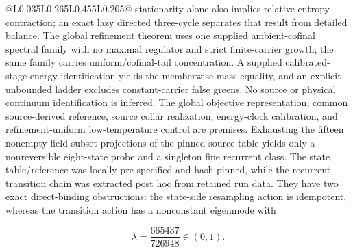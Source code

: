 \documentclass[10pt]{article}
\begin{document}
\begin{center}
\begin{longtable}{@{}L{0.035\linewidth}L{0.265\linewidth}L{0.455\linewidth}L{0.205\linewidth}@{}}
stationarity alone also implies relative-entropy contraction; an exact lazy
directed three-cycle separates that result from detailed balance. The global
refinement theorem uses one supplied ambient-cofinal spectral family with
no maximal regulator and strict finite-carrier growth; the same family carries
uniform/cofinal-tail concentration. A supplied calibrated-stage energy
identification yields the memberwise mass equality, and an explicit
unbounded ladder excludes constant-carrier false greens.  No source or
physical continuum identification is inferred. The global
objective representation, common source-derived reference, source collar
realization, energy-clock calibration, and refinement-uniform low-temperature
control are premises. Exhausting the fifteen
nonempty field-subset projections of the pinned source table yields only a
nonreversible eight-state probe and a singleton fine recurrent class. The
state table/reference was locally pre-specified and hash-pinned, while the
recurrent transition chain was extracted post hoc from retained run data.
They have
two exact direct-binding obstructions: the state-side resampling action is
idempotent, whereas the transition action has a nonconstant eigenmode with

\[
\lambda=\frac{665437}{726948}\in(0,1).
\]


\end{longtable}
\end{center}
\end{document}
